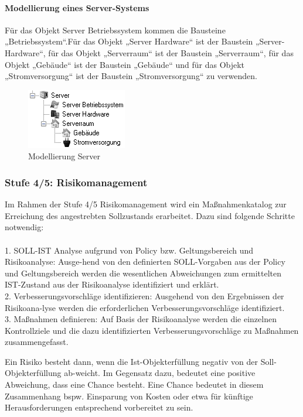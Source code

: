 \paragraph{Modellierung eines Server-Systems}
Für das Objekt Server Betriebssystem kommen die Bausteine „Betriebssystem“.Für das Objekt „Server Hardware“ ist der Baustein „Server-Hardware“, für das Objekt „Serverraum“ ist der Baustein „Serverraum“, für das Objekt „Gebäude“ ist der Baustein „Gebäude“ und für das Objekt „Stromversorgung“ ist der Baustein „Stromversorgung“ zu verwenden.
\begin{figure}[htbp]
	\centering
	\includegraphics[scale =1 ]{images/server.png}
	\caption{Modellierung Server}
	\label{fig:bsp}
\end{figure}

\subsubsection{Stufe 4/5: Risikomanagement}
Im Rahmen der Stufe 4/5 Risikomanagement wird ein Maßnahmenkatalog zur Erreichung des angestrebten Sollzustands erarbeitet. Dazu sind folgende Schritte notwendig:\\\\
1. SOLL-IST Analyse aufgrund von Policy bzw. Geltungsbereich und Risikoanalyse: Ausge-hend von den definierten SOLL-Vorgaben aus der Policy und Geltungsbereich werden die wesentlichen Abweichungen zum ermittelten IST-Zustand aus der Risikoanalyse identifiziert und erklärt.\\
2. Verbesserungsvorschläge identifizieren: Ausgehend von den Ergebnissen der Risikoana-lyse werden die erforderlichen Verbesserungsvorschläge identifiziert.\\
3. Maßnahmen definieren: Auf Basis der Risikoanalyse werden die einzelnen Kontrollziele und die dazu identifizierten Verbesserungsvorschläge zu Maßnahmen zusammengefasst.

Ein Risiko besteht dann, wenn die Ist-Objekterfüllung negativ von der Soll-Objekterfüllung ab-weicht. Im Gegensatz dazu, bedeutet eine positive Abweichung, dass eine Chance besteht. Eine Chance bedeutet in diesem Zusammenhang bspw. Einsparung von Kosten oder etwa für künftige Herausforderungen entsprechend vorbereitet zu sein.
